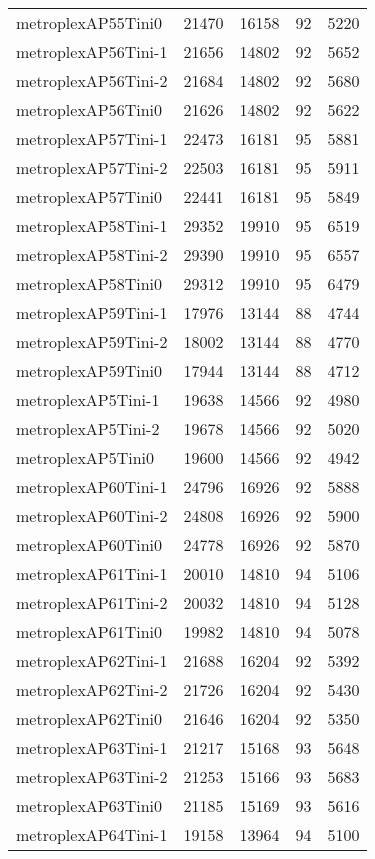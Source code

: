\begin{tabular}{lrrrr}
metroplexAP55Tini0 & 21470 & 16158 & 92 & 5220 \\
metroplexAP56Tini-1 & 21656 & 14802 & 92 & 5652 \\
metroplexAP56Tini-2 & 21684 & 14802 & 92 & 5680 \\
metroplexAP56Tini0 & 21626 & 14802 & 92 & 5622 \\
metroplexAP57Tini-1 & 22473 & 16181 & 95 & 5881 \\
metroplexAP57Tini-2 & 22503 & 16181 & 95 & 5911 \\
metroplexAP57Tini0 & 22441 & 16181 & 95 & 5849 \\
metroplexAP58Tini-1 & 29352 & 19910 & 95 & 6519 \\
metroplexAP58Tini-2 & 29390 & 19910 & 95 & 6557 \\
metroplexAP58Tini0 & 29312 & 19910 & 95 & 6479 \\
metroplexAP59Tini-1 & 17976 & 13144 & 88 & 4744 \\
metroplexAP59Tini-2 & 18002 & 13144 & 88 & 4770 \\
metroplexAP59Tini0 & 17944 & 13144 & 88 & 4712 \\
metroplexAP5Tini-1 & 19638 & 14566 & 92 & 4980 \\
metroplexAP5Tini-2 & 19678 & 14566 & 92 & 5020 \\
metroplexAP5Tini0 & 19600 & 14566 & 92 & 4942 \\
metroplexAP60Tini-1 & 24796 & 16926 & 92 & 5888 \\
metroplexAP60Tini-2 & 24808 & 16926 & 92 & 5900 \\
metroplexAP60Tini0 & 24778 & 16926 & 92 & 5870 \\
metroplexAP61Tini-1 & 20010 & 14810 & 94 & 5106 \\
metroplexAP61Tini-2 & 20032 & 14810 & 94 & 5128 \\
metroplexAP61Tini0 & 19982 & 14810 & 94 & 5078 \\
metroplexAP62Tini-1 & 21688 & 16204 & 92 & 5392 \\
metroplexAP62Tini-2 & 21726 & 16204 & 92 & 5430 \\
metroplexAP62Tini0 & 21646 & 16204 & 92 & 5350 \\
metroplexAP63Tini-1 & 21217 & 15168 & 93 & 5648 \\
metroplexAP63Tini-2 & 21253 & 15166 & 93 & 5683 \\
metroplexAP63Tini0 & 21185 & 15169 & 93 & 5616 \\
metroplexAP64Tini-1 & 19158 & 13964 & 94 & 5100 \\

\end{tabular}
